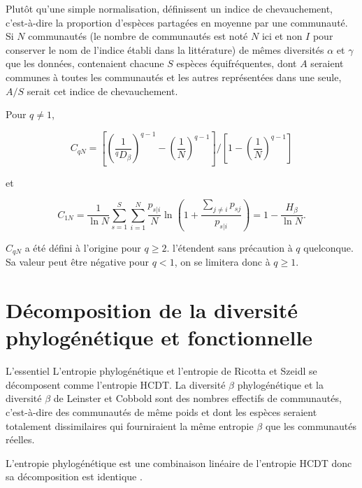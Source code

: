 \documentclass[
  11pt,
  french,
  a4paper,
  extrafontsizes,onecolumn,openright
  ]{memoir}
\newenvironment{Summary}
  {\begin{bclogo}[logo=\bctrombone, noborder=true, couleur=lightgray!50]{L'essentiel}\parindent0pt}
  {\end{bclogo}}
\begin{document}
Plutôt qu'une simple normalisation, \textcite{Chao2008} définissent un indice de chevauchement, c'est-à-dire la proportion d'espèces partagées en moyenne par une communauté.
Si \(N\) communautés (le nombre de communautés est noté \(N\) ici et non \(I\) pour conserver le nom de l'indice établi dans la littérature) de mêmes diversités \(\alpha\) et \(\gamma\) que les données, contenaient chacune \(S\) espèces équifréquentes, dont \(A\) seraient communes à toutes les communautés et les autres représentées dans une seule, \(A/S\) serait cet indice de chevauchement.

Pour \(q\ne 1\),

\begin{equation}
  \label{eq:Chao2008q}
  C_{qN} = {\left[{\left(\frac{1}{^{q}\!D_{\beta}}\right)}^{q-1}-{\left(\frac{1}{N}\right)}^{q-1}\right]}/{\left[1-{\left(\frac{1}{N}\right)}^{q-1}\right]}
\end{equation}

et

\begin{equation}
  \label{eq:C1N}
  C_{1N} 
  =\frac{1}{\ln{N}}\sum^S_{s=1}{\sum^N_{i=1}{\frac{p_{s|i}}{N}\ln\left(1+\frac{\sum_{j\ne i}{p_{sj}}}{p_{s|i}}\right)}}
  =1-\frac{H_{\beta}}{\ln{N}}.
\end{equation}

\(C_{qN}\) a été défini à l'origine pour \(q\ge 2\).
\textcite{Chao2012a} l'étendent sans précaution à \(q\) quelconque.
Sa valeur peut être négative pour \(q<1\), on se limitera donc à \(q \ge 1\).

\chapter{Décomposition de la diversité phylogénétique et fonctionnelle}\label{duxe9composition-de-la-diversituxe9-phyloguxe9nuxe9tique-et-fonctionnelle}

\begin{Summary}
L'entropie phylogénétique et l'entropie de Ricotta et Szeidl se décomposent comme l'entropie HCDT.
La diversité \(\beta\) phylogénétique et la diversité \(\beta\) de Leinster et Cobbold sont des nombres effectifs de communautés, c'est-à-dire des communautés de même poids et dont les espèces seraient totalement dissimilaires qui fourniraient la même entropie \(\beta\) que les communautés réelles.

\end{Summary}

L'entropie phylogénétique est une combinaison linéaire de l'entropie HCDT donc sa décomposition est identique \autocite{Marcon2014b}.
\end{document}
